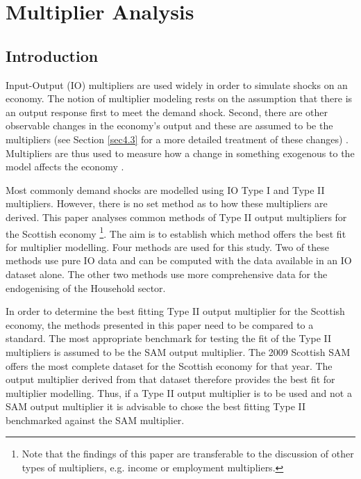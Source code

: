 \chapter{Multiplier Analysis}
\label{Chapter4}

\begin{doublespacing}

\section{Introduction}
\label{sec:4.1}

Input-Output (IO) multipliers are used widely in order to simulate shocks on an economy. The notion of multiplier modeling rests on the assumption that there is an output response first to meet the demand shock. Second, there are other observable changes in the economy's output and these are assumed to be the multipliers (see Section \ref{sec4.3} for a more detailed treatment of these changes) \cite{Miller2009}. Multipliers are thus used to measure how a change in something exogenous to the model affects the economy \cite{Miller2009}.

\bigskip

Most commonly demand shocks are modelled using IO Type I and Type II multipliers. However, there is no set method as to how these multipliers are derived. This paper analyses common methods of Type II output multipliers for the Scottish economy \footnote{Note that the findings of this paper are transferable to the discussion of other types of multipliers, e.g. income or employment multipliers.}. The aim is to establish which method offers the best fit for multiplier modelling. Four methods are used for this study. Two of these methods use pure IO data and can be computed with the data available in an IO dataset alone. The other two methods use more comprehensive data for the endogenising of the Household sector.

\bigskip

In order to determine the best fitting Type II output multiplier for the Scottish economy, the methods presented in this paper need to be compared to a standard. The most appropriate benchmark for testing the fit of the Type II multipliers is assumed to be the SAM output multiplier. The 2009 Scottish SAM  offers the most complete dataset for the Scottish economy for that year. The output multiplier derived from that dataset therefore provides the best fit for multiplier modelling. Thus, if a Type II output multiplier is to be used and not a SAM output multiplier it is advisable to chose the best fitting Type II benchmarked against the SAM multiplier.


\end{doublespacing}
